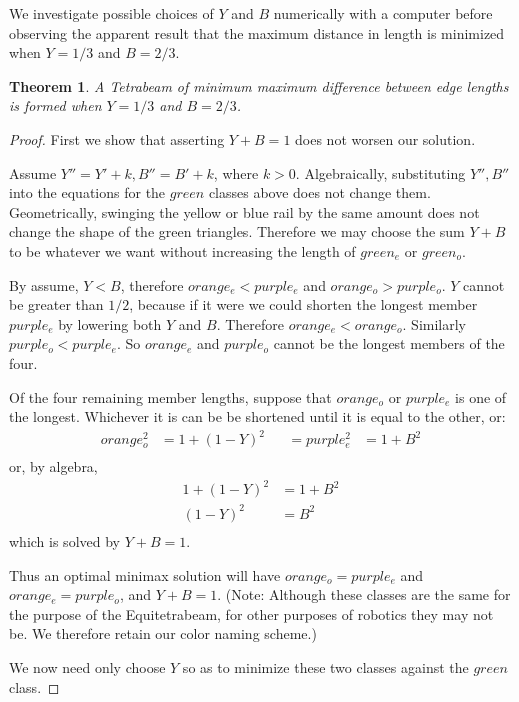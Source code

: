 \documentclass[11pt]{article}
\newtheorem{theorem}{Theorem}
\begin{document}
 We investigate possible choices of $Y$ and $B$ numerically with a computer before observing the apparent result that the maximum distance in
 length is minimized when $Y = 1/3$ and $B = 2/3$.

 \begin{theorem}
A Tetrabeam of minimum maximum difference between edge lengths is formed when $Y = 1/3$ and $B = 2/3$.
\end{theorem}

 \begin{proof}
   First we show that asserting $Y + B = 1$ does not worsen our solution.

   Assume $Y'' = Y' + k, B'' = B' + k$, where $k > 0$. Algebraically, substituting $Y'', B''$ into the equations for the $green$
   classes above does not change them. Geometrically, swinging  the yellow or blue rail by the same amount does not change the
   shape of the green triangles. Therefore we may choose the sum $ Y+B $ to be whatever we want without increasing the length
   of $green_e$ or $green_o$.

   By assume, $Y < B$, therefore $orange_e < purple_e$ and $orange_o > purple_o$. $Y$ cannot be greater than $1/2$, because
   if it were we could shorten the longest member $purple_e$ by lowering both $Y$ and $B$. Therefore $orange_e < orange_o$.
   Similarly $purple_o < purple_e$. So $orange_e$ and $purple_o$ cannot be the longest members of the four.

   Of the four remaining member lengths, suppose that $orange_o$ or $purple_e$ is one of the longest. Whichever it is can be be shortened
   until it is equal to the other, or:
 \begin{align*}
 orange_o^2  &= 1 + (1-Y)^2 & &=  purple_e^2  &= 1 + B^2\\
 \end{align*}
 or, by algebra,
 \begin{align*}
   1 + (1-Y)^2 &= 1 + B^2\\
   (1-Y)^2 &= B^2\\
 \end{align*}
 which is solved by $Y+B = 1$.

 Thus an optimal minimax solution will have $orange_o = purple_e$ and $orange_e = purple_o$, and $Y+B = 1$.
 (Note: Although these classes are the same for the purpose of the Equitetrabeam, for other purposes of robotics
 they may not be. We therefore retain our color naming scheme.)

 We now need only choose $Y$ so as to minimize these two classes against the $green$ class.


\end{proof}
\end{document}
